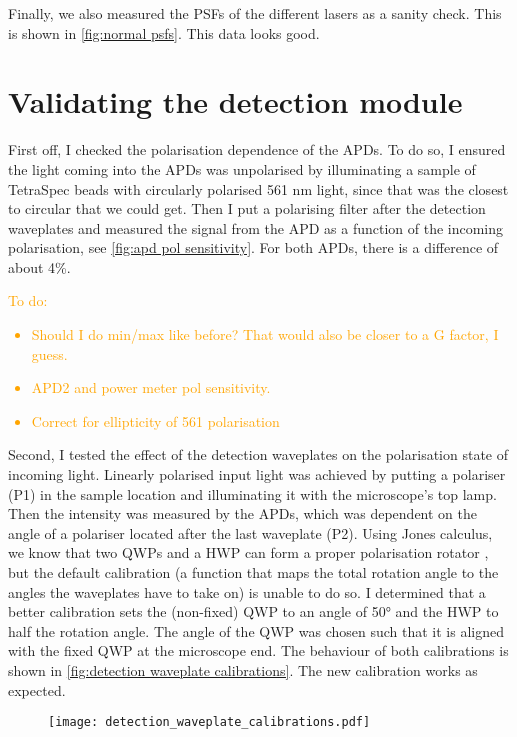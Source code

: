 Finally, we also measured the PSFs of the different lasers as a sanity check. This is shown in \autoref{fig:normal psfs}. This data looks good.  

\section{Validating the detection module}

First off, I checked the polarisation dependence of the APDs. To do so, I ensured the light coming into the APDs was unpolarised by illuminating a sample of TetraSpec beads with circularly polarised 561 nm light, since that was the closest to circular that we could get. Then I put a polarising filter after the detection waveplates and measured the signal from the APD as a function of the incoming polarisation, see \autoref{fig:apd pol sensitivity}. For both APDs, there is a difference of about 4\%.

\textcolor{orange}{
To do:
	\begin{itemize}
		\item Should I do min/max like before? That would also be closer to a G factor, I guess.
		\item APD2 and power meter pol sensitivity.
		\item Correct for ellipticity of 561 polarisation
	\end{itemize}
} 

Second, I tested the effect of the detection waveplates on the polarisation state of incoming light. Linearly polarised input light was achieved by putting a polariser (P1) in the sample location and illuminating it with the microscope's top lamp. Then the intensity was measured by the APDs, which was dependent on the angle of a polariser located after the last waveplate (P2). Using Jones calculus, we know that two QWPs and a HWP can form a proper polarisation rotator , but the default calibration (a function that maps the total rotation angle to the angles the waveplates have to take on) is unable to do so. I determined that a better calibration sets the (non-fixed) QWP to an angle of 50° and the HWP to half the rotation angle. The angle of the QWP was chosen such that it is aligned with the fixed QWP at the microscope end. The behaviour of both calibrations is shown in \autoref{fig:detection waveplate calibrations}. The new calibration works as expected.

\begin{figure}
	\centering
	\texttt{[image: detection\_waveplate\_calibrations.pdf]}
	\caption{}
	\label{fig:detection waveplate calibrations}
\end{figure}

